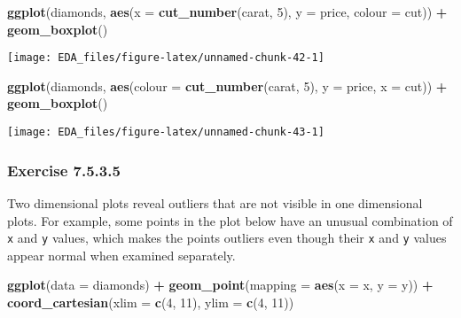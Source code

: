 \documentclass[]{book}
\newenvironment{Shaded}{\begin{snugshade}}{\end{snugshade}}
\newcommand{\DataTypeTok}[1]{\textcolor[rgb]{0.13,0.29,0.53}{#1}}
\newcommand{\DecValTok}[1]{\textcolor[rgb]{0.00,0.00,0.81}{#1}}
\newcommand{\KeywordTok}[1]{\textcolor[rgb]{0.13,0.29,0.53}{\textbf{#1}}}
\newcommand{\NormalTok}[1]{#1}
\newcommand{\OperatorTok}[1]{\textcolor[rgb]{0.81,0.36,0.00}{\textbf{#1}}}
\newcommand{\StringTok}[1]{\textcolor[rgb]{0.31,0.60,0.02}{#1}}
\theoremstyle{plain}
\theoremstyle{remark}
\begin{document}
\begin{Shaded}
\begin{Highlighting}[]
\KeywordTok{ggplot}\NormalTok{(diamonds, }\KeywordTok{aes}\NormalTok{(}\DataTypeTok{x =} \KeywordTok{cut_number}\NormalTok{(carat, }\DecValTok{5}\NormalTok{), }\DataTypeTok{y =}\NormalTok{ price, }\DataTypeTok{colour =}\NormalTok{ cut)) }\OperatorTok{+}
\StringTok{  }\KeywordTok{geom_boxplot}\NormalTok{()}
\end{Highlighting}
\end{Shaded}

\begin{center}\texttt{[image: EDA\_files/figure-latex/unnamed-chunk-42-1]} \end{center}

\begin{Shaded}
\begin{Highlighting}[]
\KeywordTok{ggplot}\NormalTok{(diamonds, }\KeywordTok{aes}\NormalTok{(}\DataTypeTok{colour =} \KeywordTok{cut_number}\NormalTok{(carat, }\DecValTok{5}\NormalTok{), }\DataTypeTok{y =}\NormalTok{ price, }\DataTypeTok{x =}\NormalTok{ cut)) }\OperatorTok{+}
\StringTok{  }\KeywordTok{geom_boxplot}\NormalTok{()}
\end{Highlighting}
\end{Shaded}

\begin{center}\texttt{[image: EDA\_files/figure-latex/unnamed-chunk-43-1]} \end{center}

\hypertarget{exercise-7.5.3.5}{%
\subsubsection*{\texorpdfstring{Exercise
{7.5.3.5}}{Exercise 7.5.3.5}}\label{exercise-7.5.3.5}}

Two dimensional plots reveal outliers that are not visible in one
dimensional plots. For example, some points in the plot below have an
unusual combination of \texttt{x} and \texttt{y} values, which makes the
points outliers even though their \texttt{x} and \texttt{y} values
appear normal when examined separately.

\begin{Shaded}
\begin{Highlighting}[]
\KeywordTok{ggplot}\NormalTok{(}\DataTypeTok{data =}\NormalTok{ diamonds) }\OperatorTok{+}
\StringTok{  }\KeywordTok{geom_point}\NormalTok{(}\DataTypeTok{mapping =} \KeywordTok{aes}\NormalTok{(}\DataTypeTok{x =}\NormalTok{ x, }\DataTypeTok{y =}\NormalTok{ y)) }\OperatorTok{+}
\StringTok{  }\KeywordTok{coord_cartesian}\NormalTok{(}\DataTypeTok{xlim =} \KeywordTok{c}\NormalTok{(}\DecValTok{4}\NormalTok{, }\DecValTok{11}\NormalTok{), }\DataTypeTok{ylim =} \KeywordTok{c}\NormalTok{(}\DecValTok{4}\NormalTok{, }\DecValTok{11}\NormalTok{))}
\end{Highlighting}
\end{Shaded}
\end{document}
